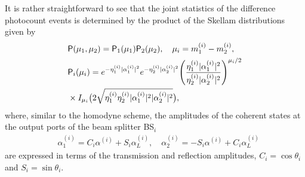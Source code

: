\documentclass[%
reprint,
superscriptaddress,
 amsmath,amssymb,amsfonts,
 aps,
 pra,
 longbibliography
]{revtex4-2}
\newcommand{\prob}{\mathsf{P}}
\begin{document}
It is rather straightforward to see that
the joint statistics of the difference photocount events
is determined by the product
of the Skellam distributions given by
\begin{align}
  &
    \label{eq:P_mu1m2}
    \prob(\mu_1,\mu_2)=\prob_1(\mu_1)\prob_2(\mu_2),
    \quad \mu_i=m_1^{(i)}-m_2^{(i)},
  \\
  &
  \label{eq:Skel-i}
  \prob_i(\mu_i)=e^{-\eta_1^{(i)}|\alpha_1^{(i)}|^2}e^{-\eta_2^{(i)}|\alpha_2^{(i)}|^2}
    \Biggl(\frac{\eta_1^{(i)}|\alpha_1^{(i)}|^2}{\eta_2^{(i)}|\alpha_2^{(i)}|^2}\Biggr)^{\mu_i/2}
    \notag
  \\
  &
    \times
I_{\mu_i}\bigl(2\sqrt{\eta_1^{(i)}\eta_2^{(i)}|\alpha_1^{(i)}|^2|\alpha_2^{(i)}|^2}\bigr),
\end{align}
where, similar to the homodyne scheme,
the amplitudes of the coherent states at the output ports of the beam splitter
BS$_i$
\begin{align}
  &
    \label{eq:amplitudes-i}
    \alpha_1^{(i)}=C_i\alpha^{(i)}+S_i\alpha_L^{(i)},\quad
    \alpha_2^{(i)}=-S_i\alpha^{(i)}+C_i\alpha_L^{(i)}
\end{align}
are expressed in terms of the transmission and reflection amplitudes,
$C_i=\cos\theta_i$ and $S_i=\sin\theta_i$.
\end{document}
